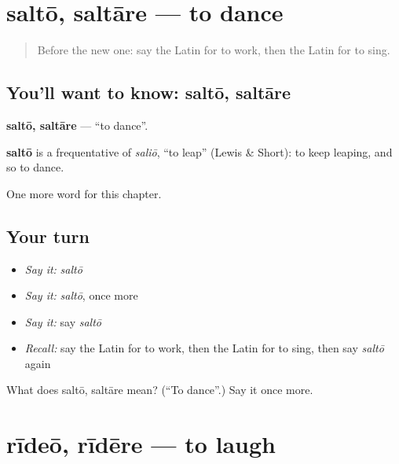 \section[saltō, saltāre]{saltō, saltāre — to dance}

\label{lesson:LA-C75-salto}



\begin{quote}
Before the new one: say the Latin for to work, then the Latin for to sing.
\end{quote}

\subsection*{You'll want to know: saltō, saltāre}
\textbf{saltō, saltāre} — \textquotedblleft{}to dance\textquotedblright{}.

\begin{cousinweb}
\textbf{saltō} is a frequentative of \emph{saliō}, \textquotedblleft{}to leap\textquotedblright{} (Lewis \& Short): to keep leaping, and so to dance.
\end{cousinweb}

\begin{grammarlens}[title={What you've built}]
One more word for this chapter.
\end{grammarlens}

\subsection*{Your turn}
\begin{itemize}
\raggedright
  \item \emph{Say it:} \emph{saltō}
  \item \emph{Say it:} \emph{saltō}, once more
  \item \emph{Say it:} say \emph{saltō}
  \item \emph{Recall:} say the Latin for to work, then the Latin for to sing, then say \emph{saltō} again
\end{itemize}

\begin{tcolorbox}[breakable,colback=teal!4,colframe=teal!35!black,title={Before you move on}]
What does saltō, saltāre mean? (\textquotedblleft{}To dance\textquotedblright{}.) Say it once more.
\end{tcolorbox}
\section[rīdeō, rīdēre]{rīdeō, rīdēre — to laugh}

